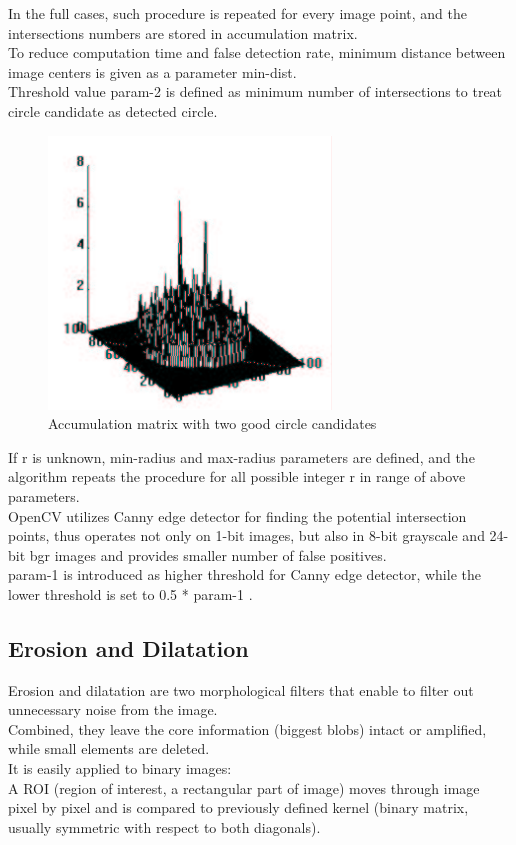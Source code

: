\documentclass[12pt,twoside,a4paper]{article}
\begin{document}
In the full cases, such procedure is repeated for every image point, and the intersections numbers are stored in accumulation matrix.\cite{hgt}\\
To reduce computation time and false detection rate, minimum distance between image centers is given as a parameter min-dist.\\
Threshold value param-2 is defined as minimum number of intersections to treat circle candidate as detected circle.
 
\begin{figure}[H]
\centering
\includegraphics[width=0.4\paperwidth]{accu}
\caption{Accumulation matrix with two good circle candidates\cite{hgt}}
\end{figure}

If r is unknown, min-radius and max-radius parameters are defined, and the algorithm repeats the procedure for all possible integer r in range of above parameters.\\
OpenCV utilizes Canny edge detector for finding the potential intersection points, thus operates not only on 1-bit images, but also in 8-bit grayscale and 24-bit bgr images and provides smaller number of false positives.\cite{mastercv}\\
param-1 is introduced as higher threshold for Canny edge detector, while the lower threshold is set to 0.5 * param-1\cite{fd} .


\subsection{Erosion and Dilatation}
Erosion and dilatation are two morphological filters that enable to filter out unnecessary noise from the image.\\
Combined, they leave the core information (biggest blobs) intact or amplified, while small elements are deleted.\\
It is easily applied to binary images:\\
A ROI (region of interest, a rectangular part of image) moves through image pixel by pixel and is compared to previously defined kernel (binary matrix, usually symmetric with respect to both diagonals).
\end{document}
